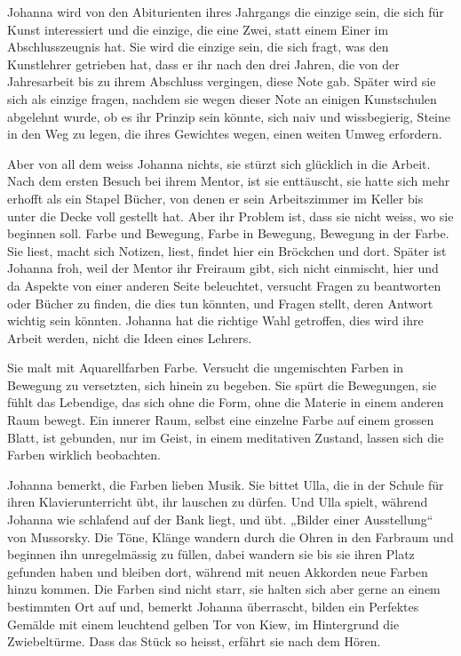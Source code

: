 \documentclass[10pt,titlepage,a5paper]{book}
\begin{document}
Johanna wird von den Abiturienten ihres Jahrgangs die einzige sein, die sich für Kunst interessiert und die einzige, die eine Zwei, statt einem Einer im Abschlusszeugnis hat. Sie wird die einzige sein, die sich fragt, was den Kunstlehrer getrieben hat, dass er ihr nach den drei Jahren, die von der Jahresarbeit bis zu ihrem Abschluss vergingen, diese Note gab. Später wird sie sich als einzige fragen, nachdem sie wegen dieser Note an einigen Kunstschulen abgelehnt wurde, ob es ihr Prinzip sein könnte, sich naiv und wissbegierig, Steine in den Weg zu legen, die ihres Gewichtes wegen, einen weiten Umweg erfordern.

Aber von all dem weiss Johanna nichts, sie stürzt sich glücklich in die Arbeit. Nach dem ersten Besuch bei ihrem Mentor, ist sie enttäuscht, sie hatte sich mehr erhofft als ein Stapel Bücher, von denen er sein Arbeitszimmer im Keller bis unter die Decke voll gestellt hat. Aber ihr Problem ist, dass sie nicht weiss, wo sie beginnen soll. Farbe und Bewegung, Farbe in Bewegung, Bewegung in der Farbe. Sie liest, macht sich Notizen, liest, findet hier ein Bröckchen und dort. Später ist Johanna froh, weil der Mentor ihr Freiraum gibt, sich nicht einmischt, hier und da Aspekte von einer anderen Seite beleuchtet, versucht Fragen zu beantworten oder Bücher zu finden, die dies tun könnten, und Fragen stellt, deren Antwort wichtig sein könnten. Johanna hat die richtige Wahl getroffen, dies wird ihre Arbeit werden, nicht die Ideen eines Lehrers.

Sie malt mit Aquarellfarben Farbe. Versucht die ungemischten Farben in Bewegung zu versetzten, sich hinein zu begeben. Sie spürt die Bewegungen, sie fühlt das Lebendige, das sich ohne die Form, ohne die Materie in einem anderen Raum bewegt. Ein innerer Raum, selbst eine einzelne Farbe auf einem grossen Blatt, ist gebunden, nur im Geist, in einem meditativen Zustand, lassen sich die Farben wirklich beobachten.

Johanna bemerkt, die Farben lieben Musik. Sie bittet Ulla, die in der Schule für ihren Klavierunterricht übt, ihr lauschen zu dürfen. Und Ulla spielt, während Johanna wie schlafend auf der Bank liegt, und übt. „Bilder einer Ausstellung“ von Mussorsky. Die Töne, Klänge wandern durch die Ohren in den Farbraum und beginnen ihn unregelmässig zu füllen, dabei wandern sie bis sie ihren Platz gefunden haben und bleiben dort, während mit neuen Akkorden neue Farben hinzu kommen. Die Farben sind nicht starr, sie halten sich aber gerne an einem bestimmten Ort auf und, bemerkt Johanna überrascht, bilden ein Perfektes Gemälde mit einem leuchtend gelben Tor von Kiew, im Hintergrund die Zwiebeltürme. Dass  das Stück so heisst, erfährt sie nach dem Hören.
\end{document}
